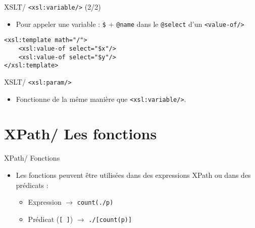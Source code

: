 \documentclass{beamer}
\begin{document}
    \begin{frame}[fragile]{XSLT/ \texttt{<xsl:variable/>} (2/2)}
        \Large
        \begin{itemize}
            \item  Pour appeler une variable : \texttt{\$} + \texttt{@name} dans le \texttt{@select} d'un \texttt{<value-of/>}
        \end{itemize}
        \normalsize
        \begin{verbatim}
<xsl:template math="/">
    <xsl:value-of select="$x"/>
    <xsl:value-of select="$y"/>
</xsl:template>
        \end{verbatim}
    \end{frame}

    \begin{frame}{XSLT/ \texttt{<xsl:param/>}}
        \Large
        \begin{itemize}
            \item Fonctionne de la même manière que \texttt{<xsl:variable/>}.
        \end{itemize}
    \end{frame}

    \section{XPath/ Les fonctions}

    \begin{frame}{XPath/ Fonctions}
        \Large
        \begin{itemize}
            \item Les fonctions peuvent être utilisées dans des expressions XPath ou dans des prédicats :
            \begin{itemize}
            \Large
                \item Expression $\rightarrow$ \texttt{count(./p)}
                \item Prédicat (\texttt{[ ]}) $\rightarrow$ \texttt{./[count(p)]}
            \end{itemize}
        \end{itemize}
    \end{frame}
\end{document}
